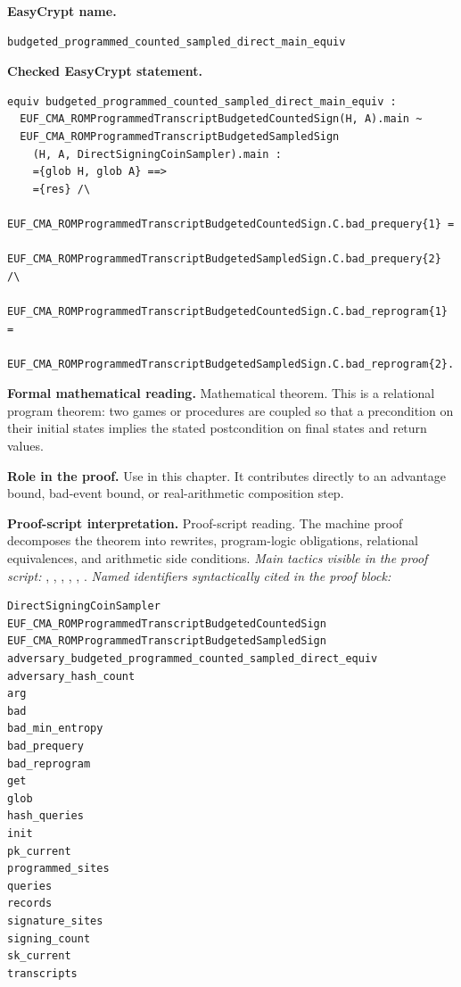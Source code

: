\begin{formaltheorem}
\noindent\textbf{EasyCrypt name.}
\begin{lstlisting}[language=EasyCrypt,basicstyle=\ttfamily\scriptsize]
budgeted_programmed_counted_sampled_direct_main_equiv
\end{lstlisting}
\noindent\textbf{Checked EasyCrypt statement.}
\begin{lstlisting}[language=EasyCrypt,basicstyle=\ttfamily\scriptsize]
equiv budgeted_programmed_counted_sampled_direct_main_equiv :
  EUF_CMA_ROMProgrammedTranscriptBudgetedCountedSign(H, A).main ~
  EUF_CMA_ROMProgrammedTranscriptBudgetedSampledSign
    (H, A, DirectSigningCoinSampler).main :
    ={glob H, glob A} ==>
    ={res} /\
    EUF_CMA_ROMProgrammedTranscriptBudgetedCountedSign.C.bad_prequery{1} =
      EUF_CMA_ROMProgrammedTranscriptBudgetedSampledSign.C.bad_prequery{2} /\
    EUF_CMA_ROMProgrammedTranscriptBudgetedCountedSign.C.bad_reprogram{1} =
      EUF_CMA_ROMProgrammedTranscriptBudgetedSampledSign.C.bad_reprogram{2}.
\end{lstlisting}
\noindent\textbf{Formal mathematical reading.}
Mathematical theorem. This is a relational program theorem: two games or procedures are coupled so that a precondition on their initial states implies the stated postcondition on final states and return values.

\noindent\textbf{Role in the proof.}
Use in this chapter. It contributes directly to an advantage bound, bad-event bound, or real-arithmetic composition step.

\noindent\textbf{Proof-script interpretation.}
Proof-script reading. The machine proof decomposes the theorem into rewrites, program-logic obligations, relational equivalences, and arithmetic side conditions.
\emph{Main tactics visible in the proof script:} , , , , , .
\emph{Named identifiers syntactically cited in the proof block:}
\begin{lstlisting}[language=EasyCrypt,basicstyle=\ttfamily\scriptsize]
DirectSigningCoinSampler
EUF_CMA_ROMProgrammedTranscriptBudgetedCountedSign
EUF_CMA_ROMProgrammedTranscriptBudgetedSampledSign
adversary_budgeted_programmed_counted_sampled_direct_equiv
adversary_hash_count
arg
bad
bad_min_entropy
bad_prequery
bad_reprogram
get
glob
hash_queries
init
pk_current
programmed_sites
queries
records
signature_sites
signing_count
sk_current
transcripts
\end{lstlisting}

\end{formaltheorem}

